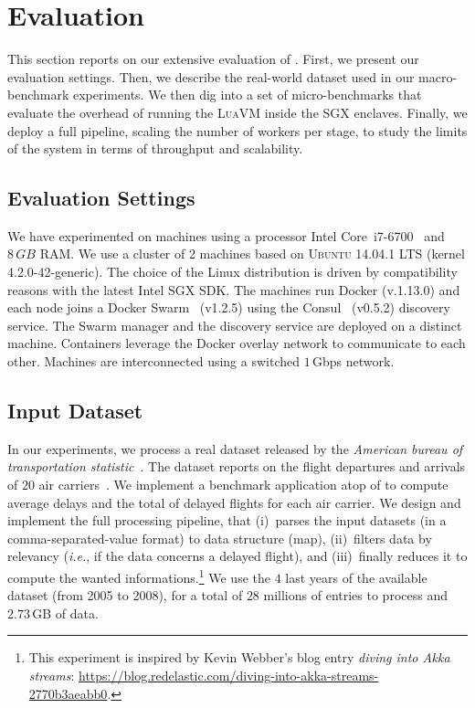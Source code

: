\section{Evaluation}\label{sec:eval}

This section reports on our extensive evaluation of \SYS{}.
First, we present our evaluation settings.
Then, we describe the real-world dataset used in our macro-benchmark experiments.
We then dig into a set of micro-benchmarks that evaluate the overhead of running the \textsc{LuaVM} inside the SGX enclaves.
Finally, we deploy a full \SYS{} pipeline, scaling the number of workers per stage, to study the limits of the system in terms of throughput and scalability.


\subsection{Evaluation Settings}

We have experimented on machines using a processor Intel Core\texttrademark~i7-6700~\cite{intel:i7_6700} and $8\,GB$ RAM.
We use a cluster of 2 machines based on \textsc{Ubuntu} 14.04.1 LTS (kernel 4.2.0-42-generic).
The choice of the Linux distribution is driven by compatibility reasons with the latest Intel SGX SDK.
The machines run Docker (v.1.13.0) and each node joins a Docker Swarm~\cite{docker:swarm_2016} (v1.2.5) using the Consul~\cite{consul} (v0.5.2) discovery service.
The Swarm manager and the discovery service are deployed on a distinct machine.
Containers leverage the Docker overlay network to communicate to each other.
Machines are interconnected using a switched $1$\,Gbps network.



\subsection{Input Dataset}

In our experiments, we process a real dataset released by the \emph{American bureau of transportation statistic}~\cite{rita:bts}.
The dataset reports on the flight departures and arrivals of $20$ air carriers~\cite{statistical_computing:data}.
We implement a benchmark application atop of \SYS{} to compute average delays and the total of delayed flights for each air carrier.
We design and implement the full processing pipeline, that (i)~parses the input datasets (in a comma-separated-value format) to data structure (\textsf{map}), (ii)~filters data by relevancy (\emph{i.e.}, if the data concerns a delayed flight), and (iii)~finally reduces it to compute the wanted informations.\footnote{This experiment is inspired by Kevin Webber's blog entry \emph{diving into Akka streams}: \url{https://blog.redelastic.com/diving-into-akka-streams-2770b3aeabb0}.}
We use the $4$ last years of the available dataset (from 2005 to 2008), for a total of $28$ millions of entries to process and $2.73$\,GB of data.

